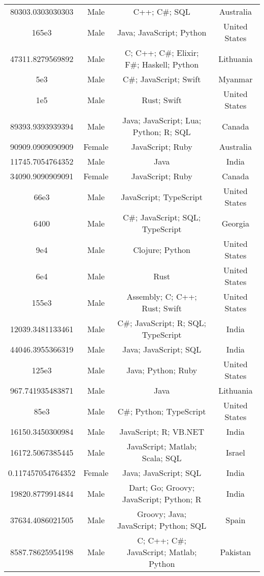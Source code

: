\begin{center}
\begin{tabular}{ |c|c|c|c| }
80303.0303030303  &  Male  &  C++; C\#; SQL  &  Australia  \\ 
165e3  &  Male  &  Java; JavaScript; Python  &  United States  \\ 
47311.8279569892  &  Male  &  C; C++; C\#; Elixir; F\#; Haskell; Python  &  Lithuania  \\ 
5e3  &  Male  &  C\#; JavaScript; Swift  &  Myanmar  \\ 
1e5  &  Male  &  Rust; Swift  &  United States  \\ 
89393.9393939394  &  Male  &  Java; JavaScript; Lua; Python; R; SQL  &  Canada  \\ 
90909.0909090909  &  Female  &  JavaScript; Ruby  &  Australia  \\ 
11745.7054764352  &  Male  &  Java  &  India  \\ 
34090.9090909091  &  Female  &  JavaScript; Ruby  &  Canada  \\ 
66e3  &  Male  &  JavaScript; TypeScript  &  United States  \\ 
6400  &  Male  &  C\#; JavaScript; SQL; TypeScript  &  Georgia  \\ 
9e4  &  Male  &  Clojure; Python  &  United States  \\ 
6e4  &  Male  &  Rust  &  United States  \\ 
155e3  &  Male  &  Assembly; C; C++; Rust; Swift  &  United States  \\ 
12039.3481133461  &  Male  &  C\#; JavaScript; R; SQL; TypeScript  &  India  \\ 
44046.3955366319  &  Male  &  Java; JavaScript; SQL  &  India  \\ 
125e3  &  Male  &  Java; Python; Ruby  &  United States  \\ 
967.741935483871  &  Male  &  Java  &  Lithuania  \\ 
85e3  &  Male  &  C\#; Python; TypeScript  &  United States  \\ 
16150.3450300984  &  Male  &  JavaScript; R; VB.NET  &  India  \\ 
16172.5067385445  &  Male  &  JavaScript; Matlab; Scala; SQL  &  Israel  \\ 
0.117457054764352  &  Female  &  Java; JavaScript; SQL  &  India  \\ 
19820.8779914844  &  Male  &  Dart; Go; Groovy; JavaScript; Python; R  &  India  \\ 
37634.4086021505  &  Male  &  Groovy; Java; JavaScript; Python; SQL  &  Spain  \\ 
8587.78625954198  &  Male  &  C; C++; C\#; JavaScript; Matlab; Python  &  Pakistan  \\ 

\end{tabular}
\end{center}
